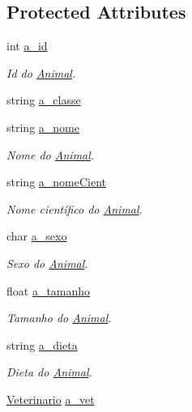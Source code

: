 \subsection*{Protected Attributes}
\begin{DoxyCompactItemize}
\item 
int \hyperlink{classAnimal_a1eab12d1133a739dc0fea720cf6cc927}{a\+\_\+id}
\begin{DoxyCompactList}\small\item\em Id do \hyperlink{classAnimal}{Animal}. \end{DoxyCompactList}\item 
string \hyperlink{classAnimal_a1f32b4455559489b5f5dce71913a6f8f}{a\+\_\+classe}
\item 
string \hyperlink{classAnimal_ad815bbe345d7c5274858ac8ccb24bc52}{a\+\_\+nome}
\begin{DoxyCompactList}\small\item\em Nome do \hyperlink{classAnimal}{Animal}. \end{DoxyCompactList}\item 
string \hyperlink{classAnimal_af2ae0fc23b0eaf3edaee4579f6199dfc}{a\+\_\+nome\+Cient}
\begin{DoxyCompactList}\small\item\em Nome científico do \hyperlink{classAnimal}{Animal}. \end{DoxyCompactList}\item 
char \hyperlink{classAnimal_af2b1c520d145f82af7a5a88bb4271a0d}{a\+\_\+sexo}
\begin{DoxyCompactList}\small\item\em Sexo do \hyperlink{classAnimal}{Animal}. \end{DoxyCompactList}\item 
float \hyperlink{classAnimal_a72366b060dfdbc0dd074fbe41decfcc2}{a\+\_\+tamanho}
\begin{DoxyCompactList}\small\item\em Tamanho do \hyperlink{classAnimal}{Animal}. \end{DoxyCompactList}\item 
string \hyperlink{classAnimal_a32088524517a531af269e3ec04275135}{a\+\_\+dieta}
\begin{DoxyCompactList}\small\item\em Dieta do \hyperlink{classAnimal}{Animal}. \end{DoxyCompactList}\item 
\hyperlink{classVeterinario}{Veterinario} \hyperlink{classAnimal_a12ce5681957e27dae674cbbde7fb1e4f}{a\+\_\+vet}

\end{DoxyCompactItemize}
